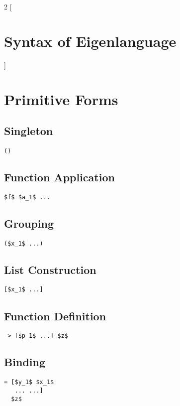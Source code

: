 \documentclass{article}
\begin{document}
\begin{multicols} 2
[\section*{\huge Syntax of Eigenlanguage}]

\section*{Primitive Forms}

\subsection*{Singleton}
\begin{lstlisting}[mathescape]
()
\end{lstlisting}

\subsection*{Function Application}
\begin{lstlisting}[mathescape]
$f$ $a_1$ ...
\end{lstlisting}

\subsection*{Grouping}
\begin{lstlisting}[mathescape]
($x_1$ ...)
\end{lstlisting}

\subsection*{List Construction}
\begin{lstlisting}[mathescape]
[$x_1$ ...]
\end{lstlisting}

\subsection*{Function Definition}
\begin{lstlisting}[mathescape]
-> [$p_1$ ...] $z$
\end{lstlisting}

\subsection*{Binding}
\begin{lstlisting}[mathescape]
= [$y_1$ $x_1$
   ... ...]
  $z$
\end{lstlisting}


\end{multicols}
\end{document}
